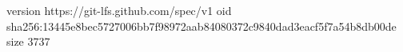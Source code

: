 version https://git-lfs.github.com/spec/v1
oid sha256:13445e8bec5727006bb7f98972aab84080372c9840dad3eacf5f7a54b8db00de
size 3737

